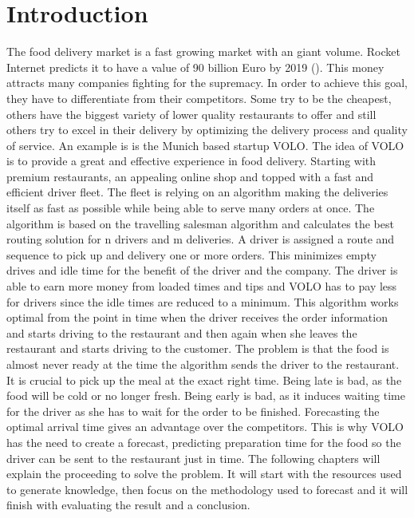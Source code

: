 \chapter{Introduction}\label{chapter:Introduction}

\renewcommand{\thepage}{\arabic{page}}
\setcounter{page}{1}

The food delivery market is a fast growing market with an giant volume. Rocket Internet predicts it to have a value of 90 billion Euro by 2019 (\cite{Rocket}). This money attracts many companies fighting for the supremacy. In order to achieve this goal, they have to differentiate from their competitors. Some try to be the cheapest, others have the biggest variety of lower quality restaurants to offer and still others try to excel in their delivery by optimizing the delivery process and quality of service.\newline
An example is is the Munich based startup VOLO. The idea of VOLO is to provide a great and effective experience in food delivery. Starting with premium restaurants, an appealing online shop and topped with a fast and efficient driver fleet. The fleet is relying on an algorithm making the deliveries itself as fast as possible while being able to serve many orders at once. The algorithm is based on the travelling salesman algorithm and calculates the best routing solution for n drivers and m deliveries. A driver is assigned a route and sequence to pick up and delivery one or more orders. This minimizes empty drives and idle time for the benefit of the driver and the company. The driver is able to earn more money from loaded times and tips and VOLO has to pay less for drivers since the idle times are reduced to a minimum.\newline
This algorithm works optimal from the point in time when the driver receives the order information and starts driving to the restaurant and then again when she leaves the restaurant and starts driving to the customer. The problem is that the food is almost never ready at the time the algorithm sends the driver to the restaurant. It is crucial to pick up the meal at the exact right time. Being late is bad, as the food will be cold or no longer fresh. Being early is bad, as it induces waiting time for the driver as she has to wait for the order to be finished. Forecasting the optimal arrival time gives an advantage over the competitors.\newline
This is why VOLO has the need to create a forecast, predicting preparation time for the food so the driver can be sent to the restaurant just in time.\newline
The following chapters will explain the proceeding to solve the problem. It will start with the resources used to generate knowledge, then focus on the methodology used to forecast and it will finish with evaluating the result and a conclusion.
